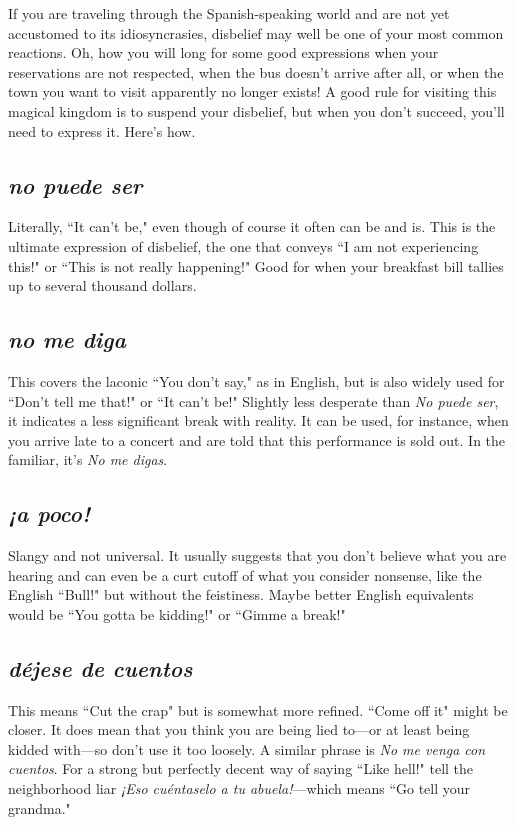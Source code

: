 If you are traveling through the Spanish-speaking world and
are not yet accustomed to its idiosyncrasies, disbelief may well be one
of your most common reactions. Oh, how you will long for some good
expressions when your reservations are not respected, when the bus
doesn't arrive after all, or when the town you want to visit apparently
no longer exists! A good rule for visiting this magical kingdom is to
suspend your disbelief, but when you don't succeed, you'll need to express it. Here's how.

\subsection{\emph{no puede ser}}

Literally, ``It can't be," even though of course it often can be
and is. This is the ultimate expression of disbelief, the one that conveys ``I am not experiencing this!" or ``This is not really happening!"
Good for when your breakfast bill tallies up to several thousand
dollars.

\subsection{\emph{no me diga}}

This covers the laconic ``You don't say," as in English, but is
also widely used for ``Don't tell me that!" or ``It can't be!" Slightly less
desperate than \emph{No puede ser}, it indicates a less significant break with
reality. It can be used, for instance, when you arrive late to a concert
and are told that this performance is sold out. In the familiar, it's \emph{No me digas}.

\subsection{\emph{¡a poco!}}

Slangy and not universal. It usually suggests that you don't believe what you are hearing and can even be a curt cutoff of what you
consider nonsense, like the English ``Bull!" but without the feistiness.
Maybe better English equivalents would be ``You gotta be kidding!" or
``Gimme a break!"

\subsection{\emph{déjese de cuentos}}

This means ``Cut the crap" but is somewhat more refined.
``Come off it" might be closer. It does mean that you think you are
being lied to---or at least being kidded with---so don't use it too loosely.
A similar phrase is \emph{No me venga con cuentos}. For a strong but
perfectly decent way of saying ``Like hell!" tell the neighborhood liar \emph{¡Eso
	cuéntaselo a tu abuela!}---which means ``Go tell your grandma."

